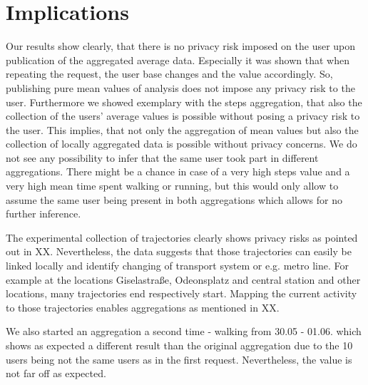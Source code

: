 \section{Implications}
Our results show clearly, that there is no privacy risk imposed on the user upon publication of the aggregated average data. Especially it was shown that when repeating the request, the user base changes and the value accordingly. So, publishing pure mean values of analysis does not impose any privacy risk to the user. Furthermore we showed exemplary with the steps aggregation, that also the collection of the users' average values is possible without posing a privacy risk to the user. This implies, that not only the aggregation of mean values but also the collection of locally aggregated data is possible without privacy concerns. We do not see any possibility to infer that the same user took part in different aggregations. There might be a chance in case of a very high steps value and a very high mean time spent walking or running, but this would only allow to assume the same user being present in both aggregations which allows for no further inference.

The experimental collection of trajectories clearly shows privacy risks as pointed out in XX. Nevertheless, the data suggests that those trajectories can easily be linked locally and identify changing of transport system or e.g. metro line. For example at the locations Giselastraße, Odeonsplatz and central station and other locations, many trajectories end respectively start. Mapping the current activity to those trajectories enables aggregations as mentioned in XX.

We also started an aggregation a second time - walking from 30.05 - 01.06. which shows as expected a different result than the original aggregation due to the 10 users being not the same users as in the first request. Nevertheless, the value is not far off as expected.

